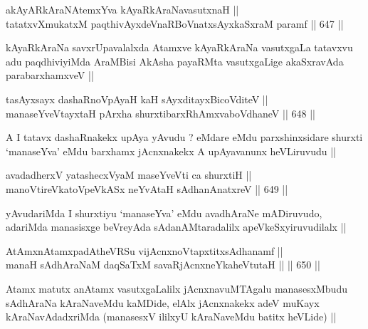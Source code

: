 
\begin{shl}
akAyARkAraNAtemxYva kAyaRkAraNavasutxnaH || \\
tatatxvXmukatxM paqthivAyxdeVnaRBoVnatxsAyxkaSxraM paramf ||  647 ||  
\end{shl}

\begin{artha}
kAyaRkAraNa savxrUpavalalxda Atamxve kAyaRkAraNa vasutxgaLa tatavxvu
adu paqdhiviyiMda AraMBisi AkAsha payaRMta vasutxgaLige akaSxravAda
parabarxhamxveV ||
\end{artha}


\begin{shl}
tasAyxsayx dashaRnoVpAyaH kaH sAyxditayxBicoVditeV || \\
manaseYveVtayxtaH pArxha shurxtibarxRhAmxvaboVdhaneV ||  648 ||  
\end{shl}

\begin{artha}
A I tatavx dashaRnakekx upAya yAvudu ? eMdare eMdu parxshinxsidare
shurxti `manaseYva' eMdu barxhamx jAcnxnakekx A upAyavanunx
heVLiruvudu ||
\end{artha}

\begin{shl}
avadadherxV yatashecxVyaM maseYveVti ca shurxtiH || \\
manoVtireVkatoV\s peVkASx neYvAtaH sAdhanAnatxreV ||  649 ||  
\end{shl}

\begin{artha}
yAvudariMda I shurxtiyu `manaseYva' eMdu avadhAraNe mADiruvudo,
adariMda manasisxge beVreyAda sAdanAMtaradalilx apeVkeSxyiruvudilalx ||
\end{artha}

\begin{shl}
AtAmxnAtamxpadAtheVRSu vijAcnxnoVtapxtitxsAdhanamf || \\
manaH sAdhAraNaM daqSaTxM savaRjAcnxneYkaheVtutaH ||  ||  650 ||  
\end{shl}

\begin{artha}
Atamx matutx anAtamx vasutxgaLalilx jAcnxnavuMTAgalu manasesxMbudu
sAdhAraNa kAraNaveMdu kaMDide, elAlx jAcnxnakekx adeV muKayx
kAraNavAdadxriMda (manasesxV ililxyU kAraNaveMdu batitx heVLide) ||
\end{artha}



